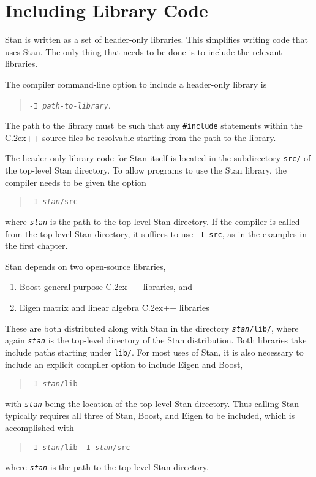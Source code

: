\documentclass[10pt]{report}
\newcommand{\Stan}{Stan\xspace}
\newcommand*{\Cpp}{C\raise.2ex\hbox{\footnotesize ++}\xspace} %
\newcommand{\code}[1]{{\tt #1}}
\begin{document}
\section{Including Library Code}

\Stan is written as a set of header-only libraries.  This simplifies
writing code that uses \Stan.  The only thing that needs to be done
is to include the relevant libraries.  

The compiler command-line option to include a
header-only library is 
%
\begin{quote}
\code{-I {\slshape path-to-library}}.
\end{quote}
%
The path to the library must be such that any \code{\#include}
statements within the \Cpp source files be resolvable starting from
the path to the library.  

The header-only library code for \Stan itself is located in the
subdirectory \code{src/} of the top-level \Stan directory.  To allow
programs to use the \Stan library, the compiler needs to be given the
option 
%
\begin{quote}
\code{-I {\slshape stan}/src} 
\end{quote}
%
where \code{\slshape stan} is the
path to the top-level \Stan directory.  If the compiler is called from the
top-level \Stan directory, it suffices to use \code{-I src}, as in the
examples in the first chapter.

\Stan depends on two open-source libraries,
%
\begin{enumerate}
\item Boost general purpose \Cpp libraries, and 
\item Eigen matrix and linear algebra \Cpp libraries
\end{enumerate}
%
These are both distributed along with \Stan in the directory
\code{{\slshape stan}/lib/}, where again \code{\slshape stan} is the
top-level directory of the \Stan distribution.  Both libraries take
include paths starting under \code{lib/}.  For most uses of \Stan, it
is also necessary to include an explicit compiler option to include
Eigen and Boost,
%
\begin{quote}
\code{-I {\slshape stan}/lib}
\end{quote}
%
with \code{\slshape stan} being the location of the top-level \Stan
directory.  Thus calling \Stan typically requires all three of \Stan,
Boost, and Eigen to be included, which is accomplished with
%
\begin{quote}
\code{-I {\slshape stan}/lib -I {\slshape stan}/src}
\end{quote}
%
where \code{\slshape stan} is the path to the top-level \Stan directory.
\end{document}
